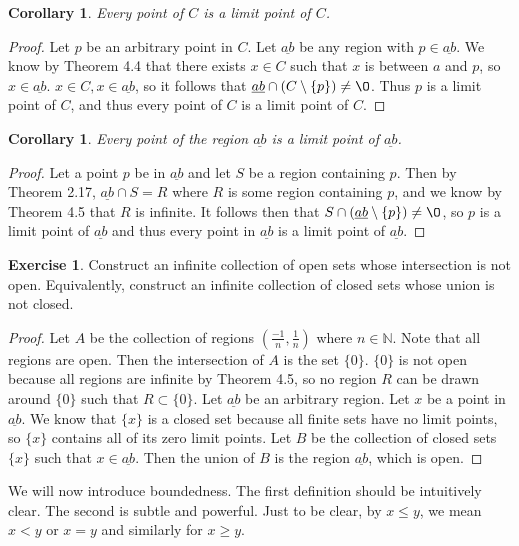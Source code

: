 \documentclass[12pt]{article}
\renewcommand{\emptyset}{\O}
\renewcommand{\_}[1]{\underline{ #1 }}
\newtheorem{corollary}[theorem]{Corollary}
\theoremstyle{definition}
\newtheorem{exercise}[theorem]{Exercise}
\numberwithin{equation}{subsection}
\begin{document}
\begin{corollary}  Every point of $C$ is a limit point of $C$.  
\end{corollary}

\begin{proof}
Let $p$ be an arbitrary point in $C$. Let $\_{ab}$ be any region with $p \in \_{ab}$. We know by Theorem 4.4 that there exists $x \in C$ such that $x$ is between $a$ and $p$, so $x \in \_{ab}$. $x \in C, x \in \_{ab}$, so it follows that $\_{ab} \cap (C \setminus \{p\}) \not = \emptyset$. Thus $p$ is a limit point of $C$, and thus every point of $C$ is a limit point of $C$.
\end{proof}

\begin{corollary}  Every point of the region $\_{ab}$ is a limit point of $\_{ab}$.
\end{corollary}

\begin{proof}
Let a point $p$ be in $\_{ab}$ and let $S$ be a region containing $p$. Then by Theorem 2.17, $\_{ab} \cap S= R$ where $R$ is some region containing $p$, and we know by Theorem 4.5 that $R$ is infinite. It follows then that $S \cap (\_{ab} \setminus \{p\}) \not = \emptyset$, so $p$ is a limit point of $\_{ab}$ and thus every point in $\_{ab}$ is a limit point of $\_{ab}$.
\end{proof}


\begin{exercise}  Construct an infinite collection of open sets whose intersection is not open.  Equivalently, construct an infinite collection of closed sets whose union is not closed.
\end{exercise}

\begin{proof}
Let $A$ be the collection of regions $(\frac{-1}{n}, \frac{1}{n})$ where $n \in \mathbb N$. Note that all regions are open. Then the intersection of $A$ is the set $\{0\}$. $\{0\}$ is not open because all regions are infinite by Theorem 4.5, so no region $R$ can be drawn around $\{0\}$ such that $R \subset \{0\}$. 
Let $\_{ab}$ be an arbitrary region. Let $x$ be a point in $\_{ab}$. We know that $\{x\}$ is a closed set because all finite sets have no limit points, so $\{x\}$ contains all of its zero limit points. Let $B$ be the collection of closed sets $\{x\}$ such that $x \in \_{ab}$. Then the union of $B$ is the region $\_{ab}$, which is open.
\end{proof}

We will now introduce boundedness.   The first definition should be intuitively clear.  The second is subtle and powerful.  Just to be clear, by $x \leq y$, we mean $x < y$ or $x = y$ and similarly for $x \geq y$.
\end{document}
